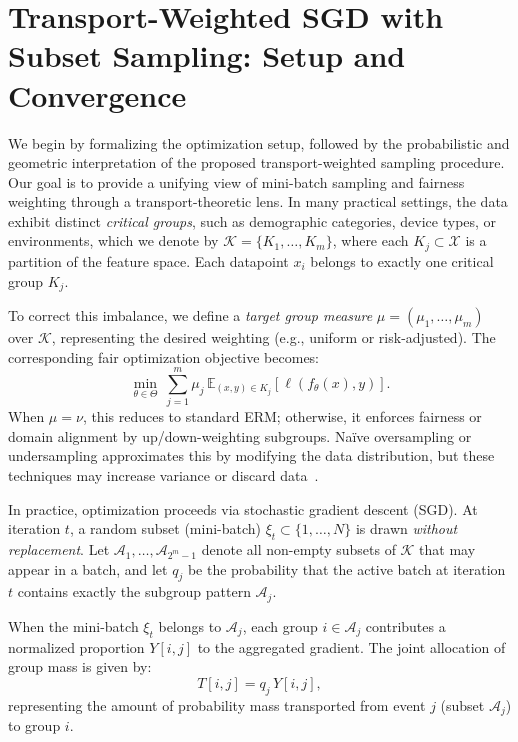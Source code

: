 \documentclass[9pt]{extarticle}
\theoremstyle{definition}
\renewcommand{\paragraph}[1]{\par\medskip\noindent{\bf #1}\hspace{0.5em}\ignorespaces}
\begin{document}
\section{Transport-Weighted SGD with Subset Sampling: Setup and Convergence}
We begin by formalizing the optimization setup, followed by the probabilistic and geometric interpretation of the proposed transport-weighted sampling procedure. Our goal is to provide a unifying view of mini-batch sampling and fairness weighting through a transport-theoretic lens.
In many practical settings, the data exhibit distinct \emph{critical groups}, such as demographic categories, device types, or environments, which we denote by $\mathcal{K}=\{K_1,\ldots,K_m\}$, where each $K_j\subset\mathcal{X}$ is a partition of the feature space. Each datapoint $x_i$ belongs to exactly one critical group $K_j$.

To correct this imbalance, we define a \emph{target group measure} $\mu=(\mu_1,\ldots,\mu_m)$ over $\mathcal{K}$, representing the desired weighting (e.g., uniform or risk-adjusted). The corresponding fair optimization objective becomes:
\begin{equation}\label{eq:fair-obj}
\boxed{\min_{\theta\in \Theta}\ \sum_{j=1}^{m}\mu_j\,\mathbb{E}_{(x,y)\in K_j}\left[\ell(f_\theta(x),y)\right]}.
\end{equation}
When $\mu=\nu$, this reduces to standard ERM; otherwise, it enforces fairness or domain alignment by up/down-weighting subgroups. Naïve oversampling or undersampling approximates this by modifying the data distribution, but these techniques may increase variance or discard data~\cite{buda2018systematic, he2009learning}.

In practice, optimization proceeds via stochastic gradient descent (SGD). At iteration $t$, a random subset (mini-batch) $\xi_t\subset\{1,\ldots,N\}$ is drawn \emph{without replacement}. Let $\mathcal{A}_1,\ldots,\mathcal{A}_{2^m-1}$ denote all non-empty subsets of $\mathcal{K}$ that may appear in a batch, and let $q_j$ be the probability that the active batch at iteration $t$ contains exactly the subgroup pattern $\mathcal{A}_j$.
\paragraph{Weighted Gradient Aggregation.}
When the mini-batch $\xi_t$ belongs to $\mathcal{A}_j$, each group $i\in\mathcal{A}_j$ contributes a normalized proportion $Y[i,j]$ to the aggregated gradient. The joint allocation of group mass is given by:
\[
T[i,j] = q_j\,Y[i,j],
\]
representing the amount of probability mass transported from event $j$ (subset $\mathcal{A}_j$) to group $i$.
\end{document}
